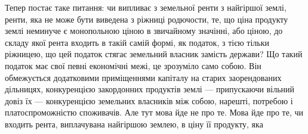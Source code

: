 Тепер постає таке питання: чи випливає з земельної ренти з найгіршої
землі, ренти, яка не може бути виведена з ріжниці родючости, те, що ціна
продукту землі неминуче є монопольною ціною в звичайному значінні, або
ціною, до складу якої рента входить в такій самій формі, як податок, з тією
тільки ріжницею, що цей податок стягає земельний власник замість держави?
Що такий податок має свої певні економічні межі, це зрозуміло само собою.
Він обмежується додатковими приміщеннями капіталу на старих заорендованих
дільницях, конкуренцією закордонних продуктів землі — припускаючи вільний
довіз їх — конкуренцією земельних власників між собою, нарешті, потребою
і платоспроможністю споживачів. Але тут мова йде не про те. Мова йде про
те, чи входить рента, виплачувана найгіршою землею, в ціну її продукту, яка